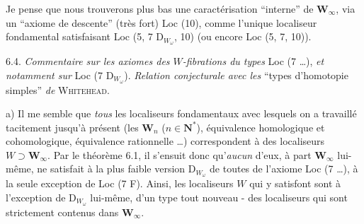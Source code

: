 \documentclass[11pt]{article}
\newcommand{\msp}[1]{\marginpar{\footnotesize [#1]}}
\begin{document}
Je pense que nous trouverons plus bas une caractérisation “interne” de $\mathbf{W}_\infty$, via un “axiome de descente” (très fort) Loc (10),
\msp{page 86}
comme l'unique localiseur fondamental satisfaisant Loc (5, 7 D$_{W_\omega}$, 10) (ou encore Loc (5, 7, 10)).

6.4. \textit{Commentaire sur les axiomes des $W$-fibrations du types} Loc (7 \ldots), \textit{et notamment sur} Loc (7 D$_{W_\omega}$). \textit{Relation conjecturale avec les} “types d'homotopie simples” \textit{de} \textsc{Whitehead}. %

a) Il me semble que \textit{tous} les localiseurs fondamentaux avec lesquels on a travaillé tacitement jusqu'à présent (les $\mathbf{W}_n$ ($n \in \mathbf{N}^*$), équivalence homologique et cohomologique, équivalence rationnelle \ldots) correspondent à des localiseurs $W \supset \mathbf{W}_\infty$. Par le théorème 6.1, il s'ensuit donc qu'\textit{aucun} d'eux, à part $\mathbf{W}_\infty$ lui-même, ne satisfait à la plus faible version D$_{W_\omega}$ de toutes de l'axiome Loc (7 \ldots), à la seule exception de Loc (7 F). Ainsi, les localiseurs $W$ qui y satisfont sont à l'exception de D$_{W_\omega}$ lui-même, d'un type tout nouveau - des localiseurs qui sont strictement contenus dans $\mathbf{W}_\infty$.
\end{document}
